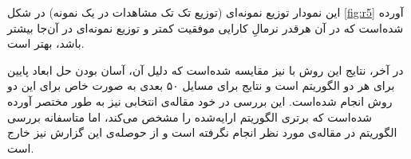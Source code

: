 \documentclass[12pt,a4paper]{article}
\theoremstyle{definition}
\theoremstyle{theorem}
\theoremstyle{definition}
\begin{document}
این نمودار توزیع نمونه‌ای (توزیع تک تک مشاهدات در یک نمونه) در شکل \ref{fig:r5} آورده شده‌است که در آن هرقدر نرمالِ کارایی موفقیت کمتر و توزیع نمونه‌ای در آن‌جا بیشتر باشد، بهتر است.

\begin{figure}
\noindent{}
\end{figure}

در آخر، نتایج این روش با 
نیز مقایسه شده‌است که دلیل آن، آسان بودن حل ابعاد پایین برای هر دو الگوریتم است و نتایج برای مسایل ۵۰ بعدی به صورت خاص برای این دو روش انجام شده‌است. این بررسی در خود مقاله‌ی انتخابی نیز به طور مختصر آورده شده‌است که برتری الگوریتم ارایه‌شده را مشخص می‌کند، اما متاسفانه بررسی الگوریتم  در مقاله‌ی مورد نظر انجام نگرفته است و از حوصله‌ی این گزارش نیز خارج است.
\end{document}
